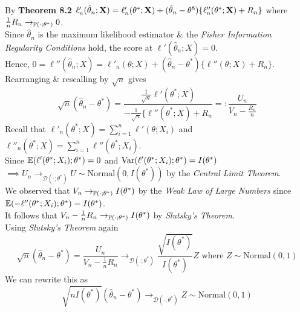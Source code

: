 \documentclass[11pt,a4paper]{article}
\begin{document}
By \textbf{Theorem 8.2} $\ell'_n(\hat{\theta}_n;\textbf{X})=\ell'_n(\theta^*;\textbf{X})+(\hat{\theta}_n-\theta^8)\{\ell''_n(\theta^*;\textbf{X})+R_n\}$ where $\frac{1}{n}R_n\to_{\mathbb{P}(\cdot;\theta^*)}0$.\\
Since $\hat{\theta}_n$ is the maximum likelihood estimator \& the \textit{Fisher Information Regularity Conditions} hold, the score at $\ell'(\hat{\theta}_n;X)=0$.\\
Hence, $0=\ell''(\hat{\theta}_n;X)=\ell'_n(\theta;X)+(\hat{\theta}_n-\theta^*)\{\ell''(\theta;X)+R_n\}$.\\
Rearranging \& rescalling by $\sqrt{n}$ gives
$$\sqrt{n}(\hat{\theta}_n-\theta^*)=\frac{\frac{1}{\sqrt{n}}\ell'(\theta^*;X)}{-\frac{1}{\sqrt{n}}\{\ell''(\theta^*;X)+R_n}=:\frac{U_n}{V_n-\frac{R_n}{n}}$$
Recall that $\ell'_n(\theta^*;X)=\sum\limits_{i=1}^n\ell'(\theta;X_i)$ and $\ell''_n(\theta^*;X)=\sum\limits_{i=1}^n\ell''(\theta^*;X_i)$.\\
Since $\mathbb{E}(\ell'(\theta^*;X_i);\theta^*)=0$ and $\mathrm{Var}(\ell'(\theta^*;X_i);\theta^*)=I(\theta^*)$\\$\implies U_n\to_{\mathcal{D}(\cdot;\theta^*)}U\sim\text{Normal}(0,I(\theta^*))$ by the \textit{Central Limit Theorem}.\\
We observed that $V_n\to_{\mathbb{P}(\cdot;\theta^*)}I(\theta^*)$ by the \textit{Weak Law of Large Numbers} since ${\mathbb{E}(-\ell''(\theta^*;X_i);\theta^*)=I(\theta^*)}$.\\
It follows that $V_n-\frac{1}{n}R_n\to_{\mathbb{P}(\cdot;\theta^*)}I(\theta^*)$ by \textit{Slutsky's Theorem}.\\
Using \textit{Slutsky's Theorem} again
$$\sqrt{n}(\hat{\theta}_n-\theta^*)=\frac{U_n}{V_n-\frac{1}{n}R_n}\to_{\mathcal{D}(\cdot;\theta^*)}\frac{\sqrt{I(\theta^*)}}{I(\theta^*)}Z\text{ where }Z\sim\text{Normal}(0,1)$$
We can rewrite this as
$$\sqrt{nI(\theta^*)}(\hat{\theta}_n-\theta^*)\to_{\mathcal{D}(\cdot;\theta^*)}Z\sim\text{Normal}(0,1)$$
\end{document}
